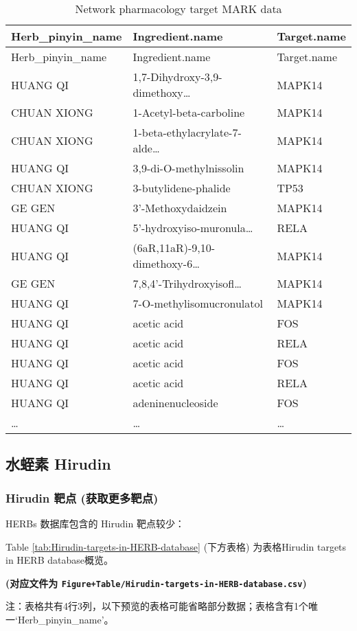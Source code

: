 \documentclass[
]{article}
\begin{document}
\begin{longtable}[]{@{}lll@{}}
\caption{\label{tab:Network-pharmacology-target-MARK-data}Network pharmacology target MARK data}\tabularnewline
\toprule
Herb\_pinyin\_name & Ingredient.name & Target.name\tabularnewline
\midrule
\endfirsthead
\toprule
Herb\_pinyin\_name & Ingredient.name & Target.name\tabularnewline
\midrule
\endhead
HUANG QI & 1,7-Dihydroxy-3,9-dimethoxy\ldots{} & MAPK14\tabularnewline
CHUAN XIONG & 1-Acetyl-beta-carboline & MAPK14\tabularnewline
CHUAN XIONG & 1-beta-ethylacrylate-7-alde\ldots{} & MAPK14\tabularnewline
HUANG QI & 3,9-di-O-methylnissolin & MAPK14\tabularnewline
CHUAN XIONG & 3-butylidene-phalide & TP53\tabularnewline
GE GEN & 3'-Methoxydaidzein & MAPK14\tabularnewline
HUANG QI & 5'-hydroxyiso-muronula\ldots{} & RELA\tabularnewline
HUANG QI & (6aR,11aR)-9,10-dimethoxy-6\ldots{} & MAPK14\tabularnewline
GE GEN & 7,8,4'-Trihydroxyisofl\ldots{} & MAPK14\tabularnewline
HUANG QI & 7-O-methylisomucronulatol & MAPK14\tabularnewline
HUANG QI & acetic acid & FOS\tabularnewline
HUANG QI & acetic acid & RELA\tabularnewline
HUANG QI & acetic acid & FOS\tabularnewline
HUANG QI & acetic acid & RELA\tabularnewline
HUANG QI & adeninenucleoside & FOS\tabularnewline
\ldots{} & \ldots{} & \ldots{}\tabularnewline
\bottomrule
\end{longtable}

\hypertarget{ux6c34ux86edux7d20-hirudin}{%
\subsection{水蛭素 Hirudin}\label{ux6c34ux86edux7d20-hirudin}}

\hypertarget{hirudin-ux9776ux70b9-ux83b7ux53d6ux66f4ux591aux9776ux70b9}{%
\subsubsection{Hirudin 靶点 (获取更多靶点)}\label{hirudin-ux9776ux70b9-ux83b7ux53d6ux66f4ux591aux9776ux70b9}}

HERBs 数据库包含的 Hirudin 靶点较少：

Table \ref{tab:Hirudin-targets-in-HERB-database} (下方表格) 为表格Hirudin targets in HERB database概览。

\textbf{(对应文件为 \texttt{Figure+Table/Hirudin-targets-in-HERB-database.csv})}

\begin{center}\begin{tcolorbox}[colback=gray!10, colframe=gray!50, width=0.9\linewidth, arc=1mm, boxrule=0.5pt]注：表格共有4行3列，以下预览的表格可能省略部分数据；表格含有1个唯一`Herb\_pinyin\_name'。
\end{tcolorbox}
\end{center}
\end{document}

